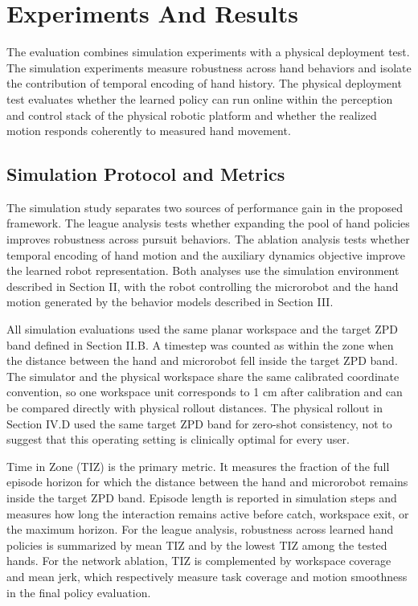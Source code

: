 \documentclass[letterpaper,journal]{IEEEtran}
\begin{document}
\section{Experiments And Results}
The evaluation combines simulation experiments with a physical deployment test. The simulation experiments measure robustness across hand behaviors and isolate the contribution of temporal encoding of hand history. The physical deployment test evaluates whether the learned policy can run online within the perception and control stack of the physical robotic platform and whether the realized motion responds coherently to measured hand movement.

\subsection{Simulation Protocol and Metrics}
The simulation study separates two sources of performance gain in the proposed framework. The league analysis tests whether expanding the pool of hand policies improves robustness across pursuit behaviors. The ablation analysis tests whether temporal encoding of hand motion and the auxiliary dynamics objective improve the learned robot representation. Both analyses use the simulation environment described in Section II, with the robot controlling the microrobot and the hand motion generated by the behavior models described in Section III.

All simulation evaluations used the same planar workspace and the target ZPD band defined in Section II.B. A timestep was counted as within the zone when the distance between the hand and microrobot fell inside the target ZPD band. The simulator and the physical workspace share the same calibrated coordinate convention, so one workspace unit corresponds to 1 cm after calibration and can be compared directly with physical rollout distances. The physical rollout in Section IV.D used the same target ZPD band for zero-shot consistency, not to suggest that this operating setting is clinically optimal for every user.

Time in Zone (TIZ) is the primary metric. It measures the fraction of the full episode horizon for which the distance between the hand and microrobot remains inside the target ZPD band. Episode length is reported in simulation steps and measures how long the interaction remains active before catch, workspace exit, or the maximum horizon. For the league analysis, robustness across learned hand policies is summarized by mean TIZ and by the lowest TIZ among the tested hands. For the network ablation, TIZ is complemented by workspace coverage and mean jerk, which respectively measure task coverage and motion smoothness in the final policy evaluation.
\end{document}
